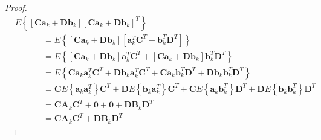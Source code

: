 \documentclass[12pt]{article}
\begin{document}
\begin{proof}
\begin{equation*}
    \begin{aligned}
        & E \left\{ \left[ \mathbf{C} \mathbf{a}_k + \mathbf{D} \mathbf{b}_k \right] \left[ \mathbf{C} \mathbf{a}_k + \mathbf{D} \mathbf{b}_k \right]^T \right\} \\
        & \phantom{XXXX} = E \left\{ \left[ \mathbf{C} \mathbf{a}_k + \mathbf{D} \mathbf{b}_k \right] \left[ \mathbf{a}_k^T \mathbf{C}^T + \mathbf{b}_k^T \mathbf{D}^T \right] \right\} \\
        & \phantom{XXXX} = E \left\{ \left[ \mathbf{C} \mathbf{a}_k + \mathbf{D} \mathbf{b}_k \right] \mathbf{a}_k^T \mathbf{C}^T
        + \left[ \mathbf{C} \mathbf{a}_k + \mathbf{D} \mathbf{b}_k \right] \mathbf{b}_k^T \mathbf{D}^T \right\} \\
        & \phantom{XXXX} = E \left\{ \mathbf{C} \mathbf{a}_k \mathbf{a}_k^T \mathbf{C}^T + \mathbf{D} \mathbf{b}_k \mathbf{a}_k^T \mathbf{C}^T
        + \mathbf{C} \mathbf{a}_k \mathbf{b}_k^T \mathbf{D}^T + \mathbf{D} \mathbf{b}_k \mathbf{b}_k^T \mathbf{D}^T \right\} \\
        & \phantom{XXXX} = \mathbf{C} E \left\{ \mathbf{a}_k \mathbf{a}_k^T \right\} \mathbf{C}^T + \mathbf{D} E \left\{ \mathbf{b}_k \mathbf{a}_k^T \right\} \mathbf{C}^T
        + \mathbf{C} E \left\{ \mathbf{a}_k \mathbf{b}_k^T \right\} \mathbf{D}^T + \mathbf{D} E \left\{ \mathbf{b}_k \mathbf{b}_k^T \right\} \mathbf{D}^T \\
        & \phantom{XXXX} = \mathbf{C} \mathbf{A}_k \mathbf{C}^T + \mathbf{0} + \mathbf{0} + \mathbf{D} \mathbf{B}_k \mathbf{D}^T \\
        & \phantom{XXXX} = \mathbf{C} \mathbf{A}_k \mathbf{C}^T + \mathbf{D} \mathbf{B}_k \mathbf{D}^T
    \end{aligned}
\end{equation*}
\end{proof}

\end{document}
